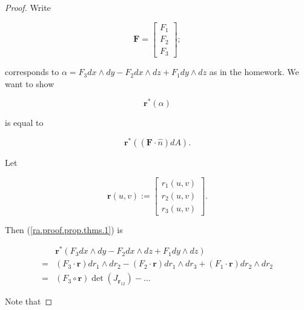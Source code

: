 \begin{proof}

Write 

\[
\boldsymbol{F} = \begin{bmatrix} F_1 \\ F_2 \\ F_3 \end{bmatrix};
\]

corresponds to \(\alpha = F_3 dx \wedge dy - F_2 dx \wedge dz + F_1 dy \wedge dz\) as in the homework. We want to show

\begin{equation}\label{ra.proof.prop.thms.1}
\boldsymbol{r}^*(\alpha)
\end{equation}

is equal to

\begin{equation}\label{ra.proof.prop.thms.2}
\boldsymbol{r}^*((\boldsymbol{F} \cdot \hat{n}) dA).
\end{equation}

Let 

\[
\boldsymbol{r}(u,v) := \begin{bmatrix}
r_1(u,v) \\
r_2(u,v) \\
r_3(u,v)
\end{bmatrix}.
\]

Then (\ref{ra.proof.prop.thms.1}) is 

\begin{align*}
& \boldsymbol{r}^*(F_3 dx \wedge dy - F_2 dx \wedge dz  + F_1 dy \wedge dz)
\\ = & (F_3 \cdot \boldsymbol{r}) dr_1 \wedge dr_2 - (F_2 \cdot \boldsymbol{r}) dr_1 \wedge dr_3 + (F_1 \cdot \boldsymbol{r}) dr_2 \wedge dr_2
\\ = & (F_3 \circ \boldsymbol{r} )\operatorname{det}(J_{\boldsymbol{r}_{12}}) - \ldots
\end{align*}

Note that



\end{proof}
